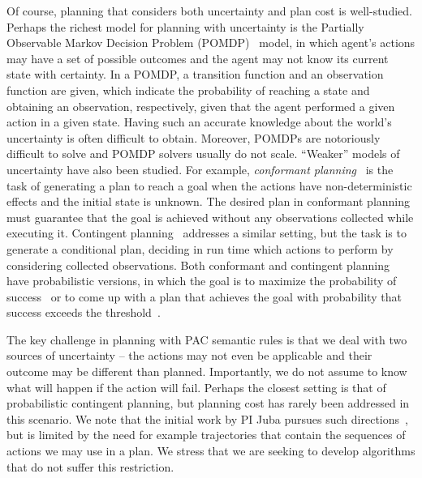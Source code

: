 \documentclass[12pt]{article}
\newcommand{\note}[1]{\textbf{\textit{#1}}}
\begin{document}
Of course, planning that considers both uncertainty and plan cost is well-studied. Perhaps the richest model for planning with uncertainty is the Partially Observable Markov Decision Problem (POMDP)~\cite{cassandra1994acting}
model, in which agent's actions may have a set of possible outcomes and the agent may not know its current state with certainty. 
In a POMDP, a transition function and an observation function are given, which indicate the probability of reaching a state and obtaining an observation, respectively, given that the agent performed a given action in a given state. Having such an accurate knowledge about the world's uncertainty is often difficult to obtain. Moreover, POMDPs are notoriously difficult to solve and POMDP solvers usually do not scale. %
``Weaker'' models of uncertainty have also been studied. 
For example, {\em conformant planning}~\cite{hoffmann2006conformant,cimatti2004conformant,cimatti1999conformant} is the task of generating a plan to reach a goal when the actions have non-deterministic effects
and the initial state is unknown. The desired plan in conformant planning must guarantee that the goal is achieved without any observations collected while executing it. Contingent planning~\cite{hoffmann2005contingent,majercik2003contingent} addresses a similar setting, but the task is to generate a conditional plan, deciding in run time which actions to perform by considering collected observations. 
Both conformant and contingent planning have probabilistic versions,
in which the goal is to maximize the probability of success~\cite{blum1999probabilistic,taig2015compilation,markou2016cost} 
or to come up with a plan that achieves the goal with probability that success exceeds the threshold~\cite{kushmerick1995algorithm}.

The key challenge in planning with PAC semantic rules is that
we deal with two sources of uncertainty -- the actions  may not even be applicable and their outcome may be different than planned. Importantly, we do not assume to know what will happen if the action will fail. Perhaps the closest setting is that of probabilistic contingent planning, but planning cost has rarely been addressed in this scenario. We note that the initial work by PI Juba pursues such directions~\cite{juba2016jmlr}, but is limited by the need for example trajectories that contain the sequences of actions we may use in a plan. We stress that we are seeking to develop algorithms that do not suffer this restriction.
\end{document}
